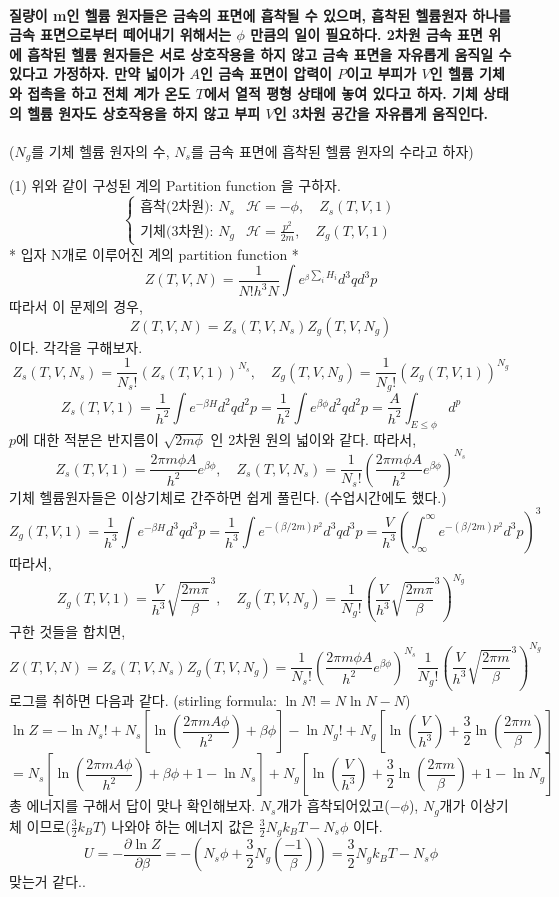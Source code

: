 \documentclass[a4paper,12pt]{article}
\begin{document}
\paragraph{질량이 m인 헬륨 원자들은 금속의 표면에 흡착될 수 있으며, 흡착된 헬륨원자 하나를 금속 표면으로부터 떼어내기 위해서는 $\phi$ 만큼의 일이 필요하다. 2차원 금속 표면 위에 흡착된 헬륨 원자들은 서로 상호작용을 하지 않고 금속 표면을 자유롭게 움직일 수 있다고 가정하자. 만약 넓이가 $A$인 금속 표면이 압력이 $P$이고 부피가 $V$인 헬륨 기체와 접촉을 하고 전체 계가 온도 $T$에서 열적 평형 상태에 놓여 있다고 하자. 기체 상태의 헬륨 원자도 상호작용을 하지 않고 부피 $V$인 3차원 공간을 자유롭게 움직인다.} ($N_g$를 기체 헬륨 원자의 수, $N_s$를 금속 표면에 흡착된 헬륨 원자의 수라고 하자)
\begin{flushleft}
	(1) 위와 같이 구성된 계의 Partition function 을 구하자.\\
	$$\begin{cases}
	\mbox{흡착(2차원): }N_s&\mathcal{H}=-\phi,\quad Z_s(T,V,1)\\ \mbox{기체(3차원): }N_g&\mathcal{H}=\frac{p^2}{2m},\quad Z_g(T,V,1)
	\end{cases}$$
	* 입자 N개로 이루어진 계의 partition function *
	$$Z(T,V,N)=\frac{1}{N! h^3N}\int e^{_\beta \sum_iH_i}d^3qd^3p$$
	따라서 이 문제의 경우,
	$$Z(T,V,N)=Z_s(T,V,N_s)Z_g(T,V,N_g)$$이다. 각각을 구해보자.
	$$Z_s(T,V,N_s)=\frac{1}{N_s!}(Z_s(T,V,1))^{N_s}, \quad Z_g(T,V,N_g)=\frac{1}{N_g!}(Z_g(T,V,1))^{N_g}$$
	$$Z_s(T,V,1)=\frac{1}{h^2}\int e^{-\beta H}d^2qd^2p=\frac{1}{h^2}\int e^{\beta \phi}d^2qd^2p=\frac{A}{h^2}\int_{E\le \phi}d^p$$
	$p$에 대한 적분은 반지름이 $\sqrt{2m\phi}$ 인 2차원 원의 넓이와 같다. 따라서,
	$$Z_s(T,V,1)=\frac{2\pi m\phi A}{h^2}e^{\beta \phi}, \quad Z_s(T,V,N_s)=\frac{1}{N_s!}\left(\frac{2\pi m\phi A}{h^2}e^{\beta \phi} \right)^{N_s} $$ 
	기체 헬륨원자들은 이상기체로 간주하면 쉽게 풀린다. (수업시간에도 했다.)
	$$Z_g(T,V,1)=\frac{1}{h^3}\int e^{-\beta H}d^3qd^3p=\frac{1}{h^3}\int e^{-(\beta/2m) p^2}d^3qd^3p=\frac{V}{h^3}\left( \int_{\infty}^{\infty} e^{-(\beta/2m) p^2}d^3p\right)^3 $$
	따라서,
	$$Z_g(T,V,1)=\frac{V}{h^3}\sqrt{\frac{2m\pi}{\beta}}^3,\quad Z_g(T,V,N_g)=\frac{1}{N_g!}\left(\frac{V}{h^3}\sqrt{\frac{2m\pi}{\beta}}^3 \right)^{N_g} $$
	구한 것들을 합치면,
	$$Z(T,V,N)=Z_s(T,V,N_s)Z_g(T,V,N_g)=\frac{1}{N_s!}\left(\frac{2\pi m\phi A}{h^2}e^{\beta \phi} \right)^{N_s}\frac{1}{N_g!}\left(\frac{V}{h^3}\sqrt{\frac{2\pi m}{\beta}}^3 \right)^{N_g}$$
	로그를 취하면 다음과 같다. (stirling formula: $\ln N!=N\ln N-N$)
	$$\ln Z=-\ln N_s!+N_s\left[\ln\left(\frac{2\pi m A \phi}{h^2} \right)+\beta \phi  \right]-\ln N_g!+N_g\left[\ln\left( \frac{V}{h^3}\right)+\frac{3}{2}\ln\left(\frac{2\pi m}{\beta} \right)   \right]  $$
	$$=N_s\left[\ln\left(\frac{2\pi m A \phi}{h^2} \right)+\beta \phi+1-\ln N_s  \right]+N_g\left[\ln\left( \frac{V}{h^3}\right)+\frac{3}{2}\ln\left(\frac{2\pi m}{\beta} \right) +1-\ln N_g  \right]$$
	총 에너지를 구해서 답이 맞나 확인해보자. $N_s$개가 흡착되어있고($-\phi$), $N_g$개가 이상기체 이므로($\frac{3}{2}k_BT$) 나와야 하는 에너지 값은 $\frac{3}{2}N_gk_BT-N_s\phi$ 이다.
	$$U=-\frac{\partial \ln Z}{\partial \beta}=-\left(N_s \phi+\frac{3}{2}N_g\left(\frac{-1}{\beta} \right)  \right)=\frac{3}{2}N_gk_BT-N_s\phi $$
	맞는거 같다.. 
\end{flushleft} 
\end{document}
